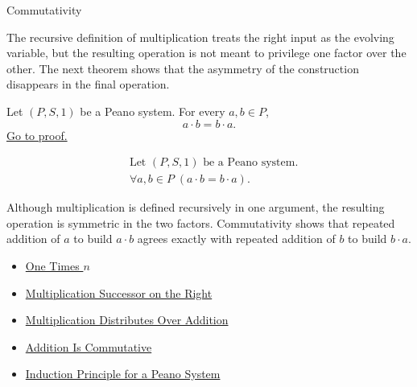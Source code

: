 \begin{topicbox}{Commutativity}
\begin{exposition}
The recursive definition of multiplication treats the right input as the
evolving variable, but the resulting operation is not meant to privilege one
factor over the other. The next theorem shows that the asymmetry of the
construction disappears in the final operation.
\end{exposition}

\begin{tcolorbox}[colback=thmbox, colframe=thmborder, arc=2pt,
  left=6pt, right=6pt, top=4pt, bottom=4pt,
  title={\small\textbf{Theorem (Multiplication Is Commutative)}},
  fonttitle=\small\bfseries]
\begin{theorem}
\label{thm:multiplication-commutative}
Let $(P,S,1)$ be a Peano system. For every $a,b \in P$,
\[
a \cdot b = b \cdot a.
\]
\hyperref[prf:multiplication-commutative]{Go to proof.}
\end{theorem}
\end{tcolorbox}

\begin{remark*}
\[
\begin{aligned}
&\text{Let } (P,S,1) \text{ be a Peano system.}\\
&\forall a,b \in P\;(a \cdot b = b \cdot a).
\end{aligned}
\]
\end{remark*}

\begin{remark*}[Interpretation]
Although multiplication is defined recursively in one argument, the resulting
operation is symmetric in the two factors. Commutativity shows that repeated
addition of $a$ to build $a \cdot b$ agrees exactly with repeated addition of
$b$ to build $b \cdot a$.
\end{remark*}

\begin{dependencies}
\begin{itemize}
  \item \hyperref[thm:one-times-n]{One Times $n$}
  \item \hyperref[thm:multiplication-successor-on-right]{Multiplication Successor on the Right}
  \item \hyperref[thm:multiplication-distributes-over-addition]{Multiplication Distributes Over Addition}
  \item \hyperref[thm:addition-commutative]{Addition Is Commutative}
  \item \hyperref[thm:induction-principle-for-peano-system]{Induction Principle for a Peano System}
\end{itemize}
\end{dependencies}
\end{topicbox}
